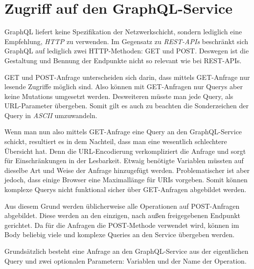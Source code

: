 \section{Zugriff auf den GraphQL-Service}
GraphQL liefert keine Spezifikation der Netzwerkschicht, sondern lediglich eine Empfehlung, \textit{HTTP} zu verwenden.
Im Gegensatz zu \textit{REST-APIs} beschränkt sich GraphQL auf lediglich zwei HTTP-Methoden: GET und POST.
Deswegen ist die Gestaltung und Bennung der Endpunkte nicht so relevant wie bei REST-APIs.
\newline

GET und POST-Anfrage unterscheiden sich darin, dass mittels GET-Anfrage nur lesende Zugriffe möglich sind.
Also können mit GET-Anfragen nur Querys aber keine Mutations umgesetzt werden.
Desweiteren müsste man jede Query, als URL-Parameter übergeben.
Somit gilt es auch zu beachten die Sonderzeichen der Query in \textit{ASCII} umzuwandeln.
\newline

Wenn man nun also mittels GET-Anfrage eine Query an den GraphQL-Service schickt, resultiert es in dem Nachteil, dass man eine wesentlich schlechtere Übersicht hat. 
Denn die URL-Encodierung verkompliziert die Anfrage und sorgt für Einschränkungen in der Lesbarkeit.
Etwaig benötigte Variablen müssten auf dieselbe Art und Weise der Anfrage hinzugefügt werden.
Problematischer ist aber jedoch, dass einige Browser eine Maximallänge für URIs vorgeben.
Somit können komplexe Querys nicht funktional sicher über GET-Anfragen abgebildet werden.
\newline

Aus diesem Grund werden üblicherweise alle Operationen auf POST-Anfragen abgebildet.
Diese werden an den einzigen, nach außen freigegebenen Endpunkt gerichtet.
Da für die Anfragen die POST-Methode verwendet wird, können im Body beliebig viele und komplexe Queries an den Service übergeben werden.
\newline

Grundsätzlich besteht eine Anfrage an den GraphQL-Service aus der eigentlichen Query und zwei optionalen Parametern: Variablen und der Name der Operation.



